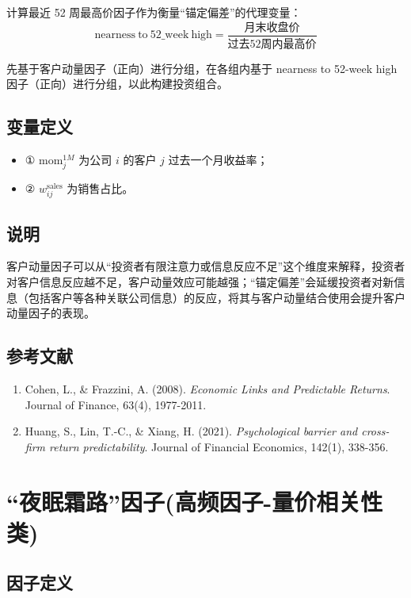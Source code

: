 \documentclass{article}
\begin{document}
计算最近 52 周最高价因子作为衡量“锚定偏差”的代理变量：
\begin{equation}
    \mathrm{nearness\ to\ 52\_week\ high} = \frac{\text{月末收盘价}}{\text{过去52周内最高价}}
\end{equation}

先基于客户动量因子（正向）进行分组，在各组内基于 nearness to 52-week high 因子（正向）进行分组，以此构建投资组合。

\subsection{变量定义}
\begin{itemize}
    \item ① \( \mathrm{mom}_j^{1M} \) 为公司 \( i \) 的客户 \( j \) 过去一个月收益率；
    \item ② \( w_{ij}^{\mathrm{sales}} \) 为销售占比。
\end{itemize}

\subsection{说明}
客户动量因子可以从“投资者有限注意力或信息反应不足”这个维度来解释，投资者对客户信息反应越不足，客户动量效应可能越强；“锚定偏差”会延缓投资者对新信息（包括客户等各种关联公司信息）的反应，将其与客户动量结合使用会提升客户动量因子的表现。

\subsection{参考文献}
\begin{enumerate}
    \item Cohen, L., \& Frazzini, A. (2008). \textit{Economic Links and Predictable Returns}. Journal of Finance, 63(4), 1977-2011.
    \item Huang, S., Lin, T.-C., \& Xiang, H. (2021). \textit{Psychological barrier and cross-firm return predictability}. Journal of Financial Economics, 142(1), 338-356.
\end{enumerate}

\section{“夜眠霜路”因子(高频因子-量价相关性类)}

\subsection{因子定义}
\end{document}

